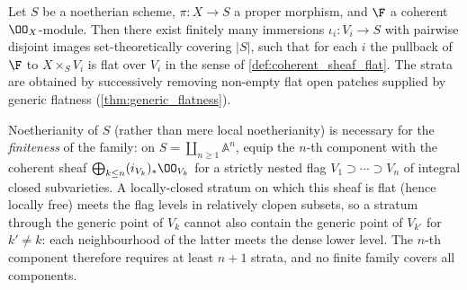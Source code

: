 \begin{lemma}\leanok
  \label{lem:flat_locus_reduction_lean}
  Let \(S\) be a noetherian scheme, \(\pi : X \to S\) a proper morphism,
  and \(\F\) a coherent \(\OO_X\)-module. Then there exist finitely many
  immersions \(\iota_i : V_i \to S\) with pairwise disjoint images
  set-theoretically covering \(|S|\), such that for each \(i\) the pullback of
  \(\F\) to \(X \times_S V_i\) is flat over \(V_i\) in the sense of
  \cref{def:coherent_sheaf_flat}.  The strata are obtained by successively
  removing non-empty flat open patches supplied by generic flatness
  (\cref{thm:generic_flatness}).

  Noetherianity of \(S\) (rather than mere local noetherianity) is necessary
  for the \emph{finiteness} of the family: on
  \(S = \coprod_{n \ge 1} \mathbb{A}^n\), equip the \(n\)-th component with
  the coherent sheaf \(\bigoplus_{k \le n} (i_{V_k})_* \OO_{V_k}\) for a
  strictly nested flag \(V_1 \supset \cdots \supset V_n\) of integral closed
  subvarieties.  A locally-closed stratum on which this sheaf is flat (hence
  locally free) meets the flag levels in relatively clopen subsets, so a
  stratum through the generic point of \(V_k\) cannot also contain the
  generic point of \(V_{k'}\) for \(k' \neq k\): each neighbourhood of the
  latter meets the dense lower level.  The \(n\)-th component therefore
  requires at least \(n + 1\) strata, and no finite family covers all
  components.
\end{lemma}

